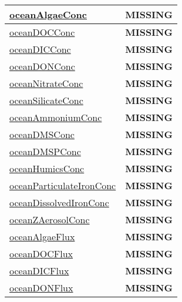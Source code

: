 {\begin{center}
\begin{longtable}{| p{2.0in} | p{4.0in} |}
    \hline
    \hyperref[subsec:var_sec_biogeochemistry_oceanAlgaeConc]{oceanAlgaeConc} & {\bf \color{red} MISSING} \\
    \hline
    \hyperref[subsec:var_sec_biogeochemistry_oceanDOCConc]{oceanDOCConc} & {\bf \color{red} MISSING} \\
    \hline
    \hyperref[subsec:var_sec_biogeochemistry_oceanDICConc]{oceanDICConc} & {\bf \color{red} MISSING} \\
    \hline
    \hyperref[subsec:var_sec_biogeochemistry_oceanDONConc]{oceanDONConc} & {\bf \color{red} MISSING} \\
    \hline
    \hyperref[subsec:var_sec_biogeochemistry_oceanNitrateConc]{oceanNitrateConc} & {\bf \color{red} MISSING} \\
    \hline
    \hyperref[subsec:var_sec_biogeochemistry_oceanSilicateConc]{oceanSilicateConc} & {\bf \color{red} MISSING} \\
    \hline
    \hyperref[subsec:var_sec_biogeochemistry_oceanAmmoniumConc]{oceanAmmoniumConc} & {\bf \color{red} MISSING} \\
    \hline
    \hyperref[subsec:var_sec_biogeochemistry_oceanDMSConc]{oceanDMSConc} & {\bf \color{red} MISSING} \\
    \hline
    \hyperref[subsec:var_sec_biogeochemistry_oceanDMSPConc]{oceanDMSPConc} & {\bf \color{red} MISSING} \\
    \hline
    \hyperref[subsec:var_sec_biogeochemistry_oceanHumicsConc]{oceanHumicsConc} & {\bf \color{red} MISSING} \\
    \hline
    \hyperref[subsec:var_sec_biogeochemistry_oceanParticulateIronConc]{oceanParticulateIronConc} & {\bf \color{red} MISSING} \\
    \hline
    \hyperref[subsec:var_sec_biogeochemistry_oceanDissolvedIronConc]{oceanDissolvedIronConc} & {\bf \color{red} MISSING} \\
    \hline
    \hyperref[subsec:var_sec_biogeochemistry_oceanZAerosolConc]{oceanZAerosolConc} & {\bf \color{red} MISSING} \\
    \hline
    \hyperref[subsec:var_sec_biogeochemistry_oceanAlgaeFlux]{oceanAlgaeFlux} & {\bf \color{red} MISSING} \\
    \hline
    \hyperref[subsec:var_sec_biogeochemistry_oceanDOCFlux]{oceanDOCFlux} & {\bf \color{red} MISSING} \\
    \hline
    \hyperref[subsec:var_sec_biogeochemistry_oceanDICFlux]{oceanDICFlux} & {\bf \color{red} MISSING} \\
    \hline
    \hyperref[subsec:var_sec_biogeochemistry_oceanDONFlux]{oceanDONFlux} & {\bf \color{red} MISSING} \\

\end{longtable}
\end{center}}

